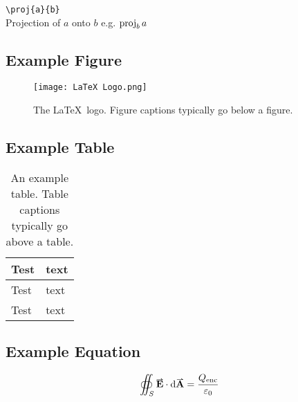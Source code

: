 \documentclass[a4paper, 12pt, english]{article}
\begin{document}
            \verb+\proj{a}{b}+\\
            Projection of $a$ onto $b$ e.g. $\proj{a}{b}$


        

    \newpage




    \newpage


    \appendices

        \subsection{Example Figure}
            \label{app: example figure}

            \begin{figure}[!h]
                \centering
                \texttt{[image: LaTeX Logo.png]}    

                \caption{The \LaTeX~logo. Figure captions typically go below a figure.}
                \label{fig: latex logo}
            \end{figure}

            \FloatBarrier

        \subsection{Example Table}
            \label{app: example table}

            \begin{table}[!h]
                \centering
                \caption{An example table. Table captions typically go above a table.}
                \label{table: example}
                \begin{tabular}{ |C{0.2\textwidth}|m{0.2\textwidth}| }
                    \hline
                    Test & text\\
                    \hline
                    \hline
                    Test & text\\
                    \hline
                    Test & text\\
                    \hline
                \end{tabular}
            \end{table}

        \subsection{Example Equation}
            \label{app: example equation}

            \begin{equation}
                \oiint_S \vect{E} \cdot \d\vect{A} = \frac{Q_{\text{enc}}}{\varepsilon_0}
                \label{eq: Gauss Law}
            \end{equation}

            
            
\end{document}
